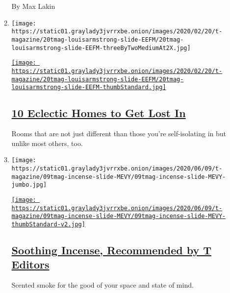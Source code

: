 \begin{enumerate}
\begin{enumerate}
    By Max Lakin
  \item
    \texttt{[image: https://static01.graylady3jvrrxbe.onion/images/2020/02/20/t-magazine/20tmag-louisarmstrong-slide-EEFM/20tmag-louisarmstrong-slide-EEFM-threeByTwoMediumAt2X.jpg]}

    \href{/2020/05/08/t-magazine/house-tours-coronavirus-distraction.html}{\texttt{[image: https://static01.graylady3jvrrxbe.onion/images/2020/02/20/t-magazine/20tmag-louisarmstrong-slide-EEFM/20tmag-louisarmstrong-slide-EEFM-thumbStandard.jpg]}}

    \hypertarget{10-eclectic-homes-to-get-lost-in}{%
    \subsection{\texorpdfstring{\href{/2020/05/08/t-magazine/house-tours-coronavirus-distraction.html}{10
    Eclectic Homes to Get Lost
    In}}{10 Eclectic Homes to Get Lost In}}\label{10-eclectic-homes-to-get-lost-in}}

    Rooms that are not just different than those you're self-isolating
    in but unlike most others, too.
  \item
    \texttt{[image: https://static01.graylady3jvrrxbe.onion/images/2020/06/09/t-magazine/09tmag-incense-slide-MEVY/09tmag-incense-slide-MEVY-jumbo.jpg]}

    \href{/2020/06/09/t-magazine/best-incense.html}{\texttt{[image: https://static01.graylady3jvrrxbe.onion/images/2020/06/09/t-magazine/09tmag-incense-slide-MEVY/09tmag-incense-slide-MEVY-thumbStandard-v2.jpg]}}

    \hypertarget{soothing-incense-recommended-by-t-editors}{%
    \subsection{\texorpdfstring{\href{/2020/06/09/t-magazine/best-incense.html}{Soothing
    Incense, Recommended by T
    Editors}}{Soothing Incense, Recommended by T Editors}}\label{soothing-incense-recommended-by-t-editors}}

    Scented smoke for the good of your space and state of mind.
  \end{enumerate}
\end{enumerate}

